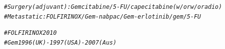 \documentclass{article}\usepackage[]{graphicx}\usepackage[]{color}
\makeatletter
\newcommand{\hlcom}[1]{\textcolor[rgb]{0.678,0.584,0.686}{\textit{#1}}}%
\newenvironment{kframe}{%
 \def\at@end@of@kframe{}%
 \ifinner\ifhmode%
  \def\at@end@of@kframe{\end{minipage}}%
  \begin{minipage}{\columnwidth}%
 \fi\fi%
 \def\FrameCommand##1{\hskip\@totalleftmargin \hskip-\fboxsep
 \colorbox{shadecolor}{##1}\hskip-\fboxsep
     \hskip-\linewidth \hskip-\@totalleftmargin \hskip\columnwidth}%
 \MakeFramed {\advance\hsize-\width
   \@totalleftmargin\z@ \linewidth\hsize
   \@setminipage}}%
 {\par\unskip\endMakeFramed%
 \at@end@of@kframe}
\newenvironment{knitrout}{}{} %
\makeatother
\begin{document}
\begin{knitrout}
{}


\begin{kframe}\begin{alltt}
\hlcom{# Surgery (adjuvant): Gemcitabine / 5-FU / capecitabine (w/ or w/o radio)}
\hlcom{# Metastatic: FOLFIRINOX / Gem-nabpac / Gem-erlotinib / gem / 5-FU}

\hlcom{# FOLFIRINOX 2010}
\hlcom{# Gem 1996 (UK) - 1997 (USA) - 2007 (Aus)}
\end{alltt}
\end{kframe}
\end{knitrout}
\end{document}
